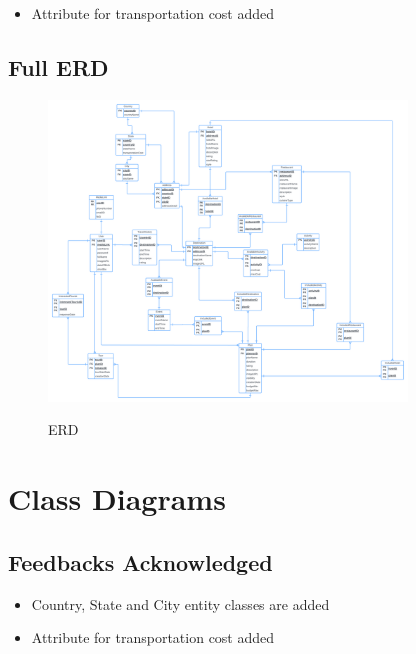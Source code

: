\documentclass[12pt]{article}
\begin{document}
\begin{itemize}
    \item Attribute for transportation cost added
\end{itemize}

\subsection{Full ERD}
\begin{figure}[H]
    \centering
        \includegraphics[width=0.85\textwidth]{ERD.png}
        \label{fig:ERD}
    \caption{ERD}
\end{figure}

\newpage

\section{Class Diagrams}
\subsection{Feedbacks Acknowledged}

\begin{itemize}
    \item Country, State and City entity classes are added
    \item Attribute for transportation cost added
\end{itemize}
\end{document}
